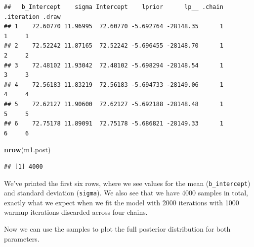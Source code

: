 \documentclass[
]{book}
\newenvironment{Shaded}{\begin{snugshade}}{\end{snugshade}}
\newcommand{\FunctionTok}[1]{\textcolor[rgb]{0.13,0.29,0.53}{\textbf{#1}}}
\newcommand{\NormalTok}[1]{#1}
\begin{document}
\begin{verbatim}
##   b_Intercept    sigma Intercept    lprior      lp__ .chain .iteration .draw
## 1    72.60770 11.96995  72.60770 -5.692764 -28148.35      1          1     1
## 2    72.52242 11.87165  72.52242 -5.696455 -28148.70      1          2     2
## 3    72.48102 11.93042  72.48102 -5.698294 -28148.54      1          3     3
## 4    72.56183 11.83219  72.56183 -5.694733 -28149.06      1          4     4
## 5    72.62127 11.90600  72.62127 -5.692188 -28148.48      1          5     5
## 6    72.75178 11.89091  72.75178 -5.686821 -28149.33      1          6     6
\end{verbatim}

\begin{Shaded}
\begin{Highlighting}[]
\FunctionTok{nrow}\NormalTok{(m1.post)}
\end{Highlighting}
\end{Shaded}

\begin{verbatim}
## [1] 4000
\end{verbatim}

We've printed the first six rows, where we see values for the mean (\texttt{b\_intercept}) and standard deviation (\texttt{sigma}). We also see that we have 4000 samples in total, exactly what we expect when we fit the model with 2000 iterations with 1000 warmup iterations discarded across four chains.

Now we can use the samples to plot the full posterior distribution for both parameters.
\end{document}
